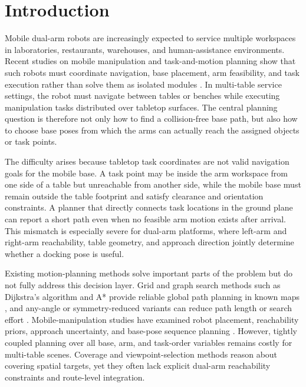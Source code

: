 \section{Introduction}
\label{sec:introduction}

Mobile dual-arm robots are increasingly expected to service multiple workspaces in laboratories, restaurants, warehouses, and human-assistance environments. Recent studies on mobile manipulation and task-and-motion planning show that such robots must coordinate navigation, base placement, arm feasibility, and task execution rather than solve them as isolated modules \cite{sandakalum2022motion,zhao2024survey,zhang2022grop,gu2023multiskill,fu2024mobilealoha}. In multi-table service settings, the robot must navigate between tables or benches while executing manipulation tasks distributed over tabletop surfaces. The central planning question is therefore not only how to find a collision-free base path, but also how to choose base poses from which the arms can actually reach the assigned objects or task points.

The difficulty arises because tabletop task coordinates are not valid navigation goals for the mobile base. A task point may be inside the arm workspace from one side of a table but unreachable from another side, while the mobile base must remain outside the table footprint and satisfy clearance and orientation constraints. A planner that directly connects task locations in the ground plane can report a short path even when no feasible arm motion exists after arrival. This mismatch is especially severe for dual-arm platforms, where left-arm and right-arm reachability, table geometry, and approach direction jointly determine whether a docking pose is useful.

Existing motion-planning methods solve important parts of the problem but do not fully address this decision layer. Grid and graph search methods such as Dijkstra's algorithm and A* provide reliable global path planning in known maps \cite{dijkstra1959note,hart1968formal,liu2023pathplanning}, and any-angle or symmetry-reduced variants can reduce path length or search effort \cite{nash2007theta,harabor2011online}. Mobile-manipulation studies have examined robot placement, reachability priors, approach uncertainty, and base-pose sequence planning \cite{reister2022combining,jauhri2022reachability,yamazaki2022approaching,naik2024basenet}. However, tightly coupled planning over all base, arm, and task-order variables remains costly for multi-table scenes. Coverage and viewpoint-selection methods reason about covering spatial targets, yet they often lack explicit dual-arm reachability constraints and route-level integration.

